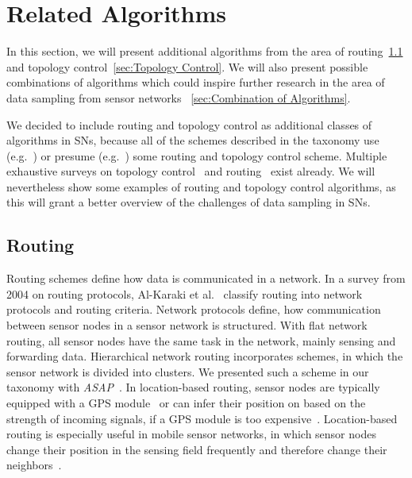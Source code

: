 \FloatBarrier

\section{Related Algorithms}
\label{sec:Related Algorithms}

In this section, we will present additional algorithms from the area of
routing~\ref{sec:Routing} and topology control~\ref{sec:Topology Control}. We
will also present possible combinations of algorithms which could inspire
further research in the area of data sampling from sensor networks
~\ref{sec:Combination of Algorithms}.

We decided to include routing and topology control as additional classes of
algorithms in \acp{SN}, because  all of the schemes described in the taxonomy
use (e.g.~\cite{padhy2006utility}) or presume
(e.g.~\cite{silberstein2006constraint}) some routing and topology control
scheme. Multiple exhaustive surveys on topology control~\cite{aziz2013survey,
li2013survey} and routing~\cite{al2004routing, pantazis2013energy,
singh2010routing} exist already. We will nevertheless show some examples of
routing and topology control algorithms, as this will grant a better overview
of the challenges of data sampling in \acp{SN}.

\subsection{Routing}
\label{sec:Routing}

Routing schemes define how data is communicated in a network. In a survey from
2004 on routing protocols, Al-Karaki et al.~\cite{al2004routing} classify
routing into network protocols and routing criteria. Network protocols define,
how communication between sensor nodes in a sensor network is structured. With
flat network routing, all sensor nodes have the same task in the network,
mainly sensing and forwarding data. Hierarchical network routing incorporates
schemes, in which the sensor network is divided into clusters. We presented
such a scheme in our taxonomy with \textit{ASAP}~\cite{gedik2007asap}. In
location-based routing, sensor nodes are typically equipped with a GPS
module~\cite{xu2001geography} or can infer their position on based on the
strength of incoming signals, if a GPS module is too
expensive~\cite{hu2004localization}. Location-based routing is especially
useful in mobile sensor networks, in which sensor nodes change their position
in the sensing field frequently and therefore change their
neighbors~\cite{hu2004localization}.

